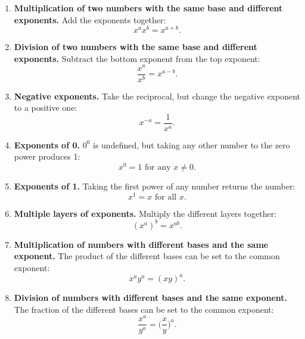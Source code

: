 \begin{enumerate}
\item \textbf{Multiplication of two numbers with the same base and different exponents.} Add the exponents together:\vspace*{-3pt}
\begin{equation*}
x^a x^b=x^{a+b}.
\end{equation*}
\item \textbf{Division of two numbers with the same base and different exponents.} Subtract the bottom exponent from the top exponent:
\begin{equation*}
\frac{x^a}{x^b}=x^{a-b}.
\end{equation*}
\item \textbf{Negative exponents.}  Take the reciprocal, but change the negative exponent to a positive one:\vspace*{-3pt}
\begin{equation*}
x^{-a}=\frac{1}{x^a}.
\end{equation*}
\item \textbf{Exponents of 0.}  $0^0$ is undefined, but taking any other number to the zero power produces 1:\vspace*{-3pt}
\begin{equation*}
x^0=1 \text{   for any   }x\neq 0.
\end{equation*}
\item \textbf{Exponents of 1.}  Taking the first power of any number returns the number:
\begin{equation*}
x^1=x\text{   for all   }x.
\end{equation*}
\item \textbf{Multiple layers of exponents.}  Multiply the different layers together:
\begin{equation*}
(x^a)^b=x^{ab}.
\end{equation*}
\item \textbf{Multiplication of numbers with different bases and the same exponent.}  The product of the different bases can be set to the common exponent:
\begin{equation*}
x^ay^a=(xy)^a.
\end{equation*}
\item \textbf{Division of numbers with different bases and the same exponent.} The fraction of the different bases can be set to the common exponent:
\begin{equation*}
\frac{x^a}{y^a}=\bigg(\frac{x}{y}\bigg)^a.
\end{equation*}
\end{enumerate}


